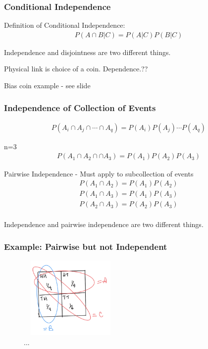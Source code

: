 \subsubsection{Conditional Independence}


Definition of Conditional Independence:
\begin{align*}
P(A \cap B | C) = P(A|C)P(B|C)
\end{align*}

 Independence and disjointness are two different things.

Physical link is choice of a coin.  Dependence.??

Bias coin example - see slide

\subsubsection{Independence of Collection of Events}


\begin{align*}
P(A_i \cap A_j \cap \cdots \cap A_q) = P(A_i)P(A_j)\cdots P(A_q)
\end{align*}

n=3
\begin{align*}
P(A_1 \cap A_2 \cap \cap A_3) = P(A_1)P(A_2)P(A_3)
\end{align*}

Pairwise Independence - Must apply to subcollection of events
\begin{align*}
P(A_1 \cap A_2 ) = P(A_1)P(A_2)\\
P(A_1 \cap A_3 ) = P(A_1)P(A_3)\\
P(A_2 \cap A_3 ) = P(A_2)P(A_3)\\
\end{align*}

 Independence and pairwise independence are two different things.

\subsubsection{Example: Pairwise but not Independent}

\begin{figure}[ht]
\centering
\includegraphics[width=5cm, height=4cm]{images/L03/collection_indep.jpeg}
\caption{...}
\end{figure}

